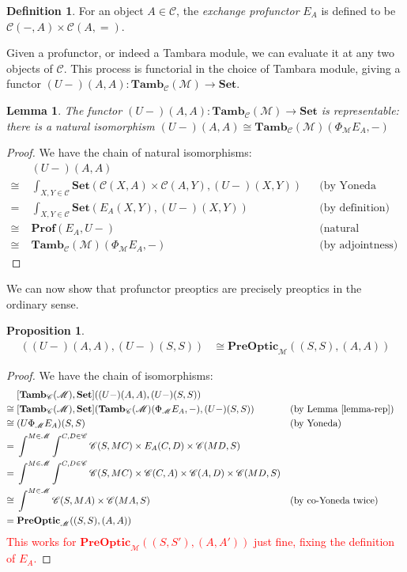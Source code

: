 \documentclass[11pt,a4paper]{article}
\theoremstyle{plain}
\newtheorem{proposition}[theorem]{Proposition}
\newtheorem{lemma}[theorem]{Lemma}
\theoremstyle{definition}
\newtheorem{definition}[theorem]{Definition}
\newcommand{\C}{\mathscr{C}}
\newcommand{\M}{\mathscr{M}}
\newcommand{\Pastro}{\Phi}
\newcommand{\Set}{\mathbf{Set}}
\newcommand{\Prof}{\mathbf{Prof}}
\newcommand{\PreOptic}{\mathbf{PreOptic}}
\newcommand{\Tamb}{\mathbf{Tamb}}
\newcommand{\todo}[1]{\textcolor{red}{\small #1}}
\begin{document}
\begin{definition}
For an object $A \in \C$, the \emph{exchange profunctor} $E_A$ is defined to be $\C(-, A) \times \C(A, {=})$.
\end{definition}

Given a profunctor, or indeed a Tambara module, we can evaluate it at any two objects of $\C$. This process is functorial in the choice of Tambara module, giving a functor $(U-)(A,A) : \Tamb_\C(\M) \to \Set$.

\begin{lemma}
\label{lemma-rep}
The functor $(U-)(A,A) : \Tamb_\C(\M) \to \Set$ is representable: there is a natural isomorphism
$(U-)(A,A) \cong \Tamb_\C(\M)(\Pastro_\M E_A, -)$
\end{lemma}
\begin{proof}
We have the chain of natural isomorphisms:
\begin{align*}
&(U-)(A,A) \\
\cong \;&\int_{X,Y \in \C} \Set(\C(X,A) \times \C(A,Y), (U-)(X,Y)) && \text{(by Yoneda (un)reduction twice)} \\
=\;&\int_{X,Y \in \C} \Set(E_A(X,Y), (U-)(X,Y)) && \text{(by definition)}\\
\cong \;&\Prof(E_A, U-) && \text{(natural transformations as ends)} \\
\cong \;&\Tamb_\C(\M)(\Pastro_\M E_A, -) && \text{(by adjointness)} 
\end{align*}
\end{proof}

We can now show that profunctor preoptics are precisely preoptics in the ordinary sense.

\begin{proposition}
\label{prop-profunctor-optics-are-optics}
\begin{align*}
[\Tamb_\C(\M), \Set]((U-)(A,A),(U-)(S,S)) &\cong \PreOptic_\M((S, S), (A, A))
\end{align*}
\end{proposition}
\begin{proof}
We have the chain of isomorphisms:
\begin{align*}
&[\Tamb_\C(\M), \Set]((U-)(A,A),(U-)(S,S)) \\
\cong \;&[\Tamb_\C(\M), \Set](\Tamb_\C(\M)(\Pastro_\M E_A, -), (U-)(S,S))  && \text{(by Lemma \ref{lemma-rep})}\\
\cong \;&(U\Pastro_\M E_A)(S,S)  && \text{(by Yoneda)} \\
= \;&\int^{M \in \M} \int^{C,D \in \C} \C(S, MC) \times E_A(C,D) \times \C(MD,S) \\
= \;&\int^{M \in \M} \int^{C,D \in \C} \C(S, MC) \times \C(C,A) \times \C(A,D) \times \C(MD,S) \\
\cong \;&\int^{M \in \M} \C(S, MA) \times \C(MA, S)  && \text{(by co-Yoneda twice)} \\
= \;&\PreOptic_\M((S, S), (A, A))
\end{align*}
\todo{This works for $\PreOptic_\M((S, S'), (A, A'))$ just fine, fixing the definition of $E_A$.}
\end{proof}
\end{document}
